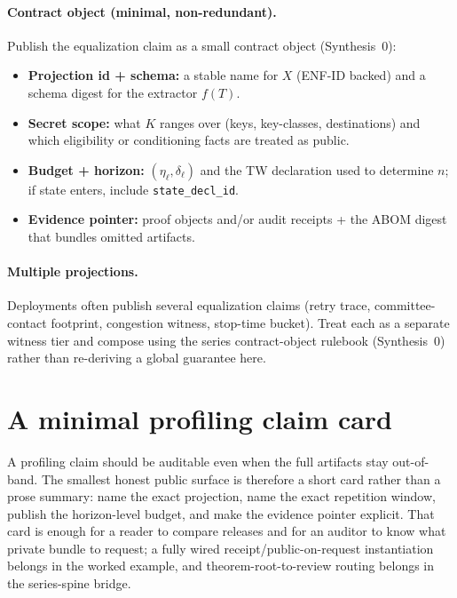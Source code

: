 \documentclass[11pt]{article}
\begin{document}
\paragraph{Contract object (minimal, non-redundant).}
Publish the equalization claim as a small contract object (Synthesis~0):\cite{series:contractobjects}
\begin{itemize}[leftmargin=*]
\item \textbf{Projection id + schema:} a stable name for $X$ (ENF-ID backed) and a schema digest for the extractor $f(T)$.\cite{series:traceifaces}
\item \textbf{Secret scope:} what $K$ ranges over (keys, key-classes, destinations) and which eligibility or conditioning facts are treated as public.
\item \textbf{Budget + horizon:} $(\eta_\ell,\delta_\ell)$ and the TW declaration used to determine $n$; if state enters, include \texttt{state\_decl\_id}.\cite{series:threatwindows,series:planstateequiv}
\item \textbf{Evidence pointer:} proof objects and/or audit receipts + the ABOM digest that bundles omitted artifacts.\cite{series:abomoinl}
\end{itemize}

\paragraph{Multiple projections.}
Deployments often publish several equalization claims (retry trace, committee-contact footprint, congestion witness, stop-time bucket).
Treat each as a separate witness tier and compose using the series contract-object rulebook (Synthesis~0) rather than re-deriving a global guarantee here.\cite{series:contractobjects}

\section{A minimal profiling claim card}
A profiling claim should be auditable even when the full artifacts stay out-of-band.
The smallest honest public surface is therefore a short card rather than a prose summary: name the exact projection, name the exact repetition window, publish the horizon-level budget, and make the evidence pointer explicit.
That card is enough for a reader to compare releases and for an auditor to know what private bundle to request; a fully wired receipt/public-on-request instantiation belongs in the worked example, and theorem-root-to-review routing belongs in the series-spine bridge.\cite{series:workedexample,series:seriesspines}
\end{document}
